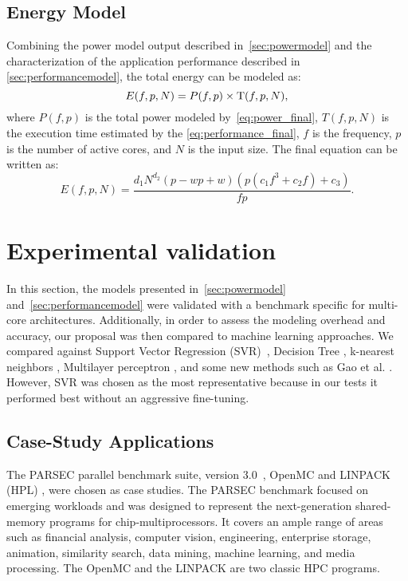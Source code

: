 \documentclass{ieeeaccess}
\begin{document}
\subsection{Energy Model} \label{sec:energymodel}
Combining the power model output described in~\cref{sec:powermodel} and the characterization of the application performance described in \cref{sec:performancemodel}, the total energy can be modeled as:
\begin{equation}
E(f,p,N)=P(f,p)\times{\rm T}(f,p,N),
\label{eq:en_combination}
\end{equation}
where $P(f,p)$ is the total power modeled by~\cref{eq:power_final}, ${T}(f,p,N)$ is the execution time estimated by the \cref{eq:performance_final}, $f$ is the frequency, $p$ is the number of active cores, and $N$ is the input size. The final equation can be written as:
\begin{equation}
    E(f,p,N)=\frac{d_1N^{d_2}(p-wp+w)(p(c_1f^3+c_2f)+c_3)}{fp}.
    \label{eq:en_final}
\end{equation}


\section{Experimental validation} \label{sec:experimentalvalidation}
In this section, the models presented in~\cref{sec:powermodel} and~\cref{sec:performancemodel} were validated with a benchmark specific for multi-core architectures. Additionally, in order to assess the modeling overhead and accuracy, our proposal was then compared to machine learning approaches. We compared against Support Vector Regression (SVR)~\cite{Smola2004}, Decision Tree \cite{Kitts2006RegressionLecture}, k-nearest neighbors \cite{Altman1992AnRegression}, Multilayer perceptron \cite{Murtagh1991MultilayerRegression}, and some new methods such as Gao et al. \cite{Gao2019DendriticPrediction}. However, SVR was chosen as the most representative because in our tests it performed best without an aggressive fine-tuning.

\subsection{Case-Study Applications} \label{sec:casestudyapplication}
The PARSEC parallel benchmark suite, version 3.0~\cite{Bienia2008}, OpenMC \cite{Romano2015OpenMC:Development} and LINPACK (HPL) \cite{Dongarra1988TheExplanation}, were chosen as case studies. The PARSEC benchmark focused on emerging workloads and was designed to represent the next-generation shared-memory programs for chip-multiprocessors. It covers an ample range of areas such as financial analysis, computer vision, engineering, enterprise storage, animation, similarity search, data mining, machine learning, and media processing. The OpenMC and the LINPACK are two classic HPC programs.
\end{document}

